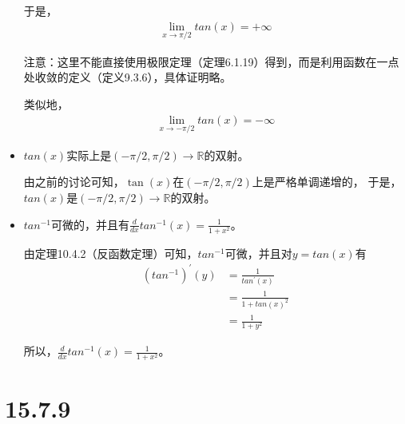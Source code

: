 \documentclass{article}
\begin{document}
\begin{itemize}
        于是，
        \begin{align*}
          \lim\limits_{x \to \pi/2} tan(x) = +\infty
        \end{align*}

        注意：这里不能直接使用极限定理（定理6.1.19）得到，而是利用函数在一点处收敛的定义（定义9.3.6），具体证明略。

        类似地，
        \begin{align*}
          \lim\limits_{x \to -\pi/2} tan(x) = -\infty
        \end{align*}

  \item $tan(x)$实际上是$(-\pi/2, \pi/2) \to \mathbb{R}$的双射。

        由之前的讨论可知，$\tan(x)$在$(-\pi/2, \pi/2)$上是严格单调递增的，
        于是，$tan(x)$是$(-\pi/2, \pi/2) \to \mathbb{R}$的双射。

  \item $tan^{-1}$可微的，并且有$\frac{d}{dx} tan^{-1}(x) = \frac{1}{1 + x^2}$。

        由定理10.4.2（反函数定理）可知，$tan^{-1}$可微，并且对$y = tan(x)$有
        \begin{align*}
          (tan^{-1})^\prime(y) & = \frac{1}{tan^\prime(x)} \\
                               & = \frac{1}{1 + tan(x)^2}  \\
                               & = \frac{1}{1 + y^2}
        \end{align*}

        所以，$\frac{d}{dx} tan^{-1}(x) = \frac{1}{1 + x^2}$。
\end{itemize}

\section*{15.7.9}
\end{document}
